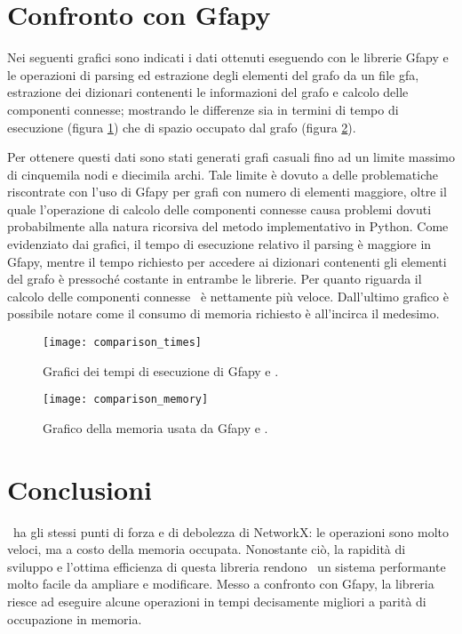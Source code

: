 \section{Confronto con Gfapy}
Nei seguenti grafici sono indicati i dati ottenuti eseguendo con le librerie
Gfapy e \pygfa le operazioni di parsing ed estrazione degli elementi del
grafo da un file gfa, estrazione dei dizionari contenenti le informazioni
del grafo e calcolo delle componenti connesse; mostrando
le differenze sia in termini di tempo di esecuzione (figura \ref{fig:comparison-times})
che di spazio occupato dal grafo (figura \ref{fig:comparison-memory}).

Per ottenere questi dati sono stati generati grafi casuali fino ad un limite massimo di cinquemila nodi
e diecimila archi. Tale limite è dovuto a delle problematiche riscontrate con l'uso di Gfapy
per grafi con numero di elementi maggiore, oltre il quale
l'operazione di calcolo delle componenti connesse causa problemi dovuti
probabilmente alla natura ricorsiva del metodo implementativo in Python.
Come evidenziato dai grafici, il tempo di esecuzione relativo il parsing
è maggiore in Gfapy, mentre il tempo richiesto per accedere ai dizionari
contenenti gli elementi del grafo è pressoché costante in entrambe le librerie.
Per quanto riguarda il calcolo delle componenti connesse \pygfa \ è nettamente
più veloce. Dall'ultimo grafico è possibile notare come il
consumo di memoria richiesto è all'incirca il medesimo.

\captionsetup{justification=centering, singlelinecheck=false}
\begin{figure}[h]
\centering
\texttt{[image: comparison\_times]}
\caption[Grafici dei tempi di esecuzione di Gfapy e \pygfa]{Grafici dei tempi di esecuzione di Gfapy e \pygfa.}
\label{fig:comparison-times}
\end{figure}
\captionsetup{justification=justified, singlelinecheck=false}


\captionsetup{justification=centering, singlelinecheck=false}
\begin{figure}[h]
\centering
\texttt{[image: comparison\_memory]}
\caption[Grafico della memoria usata da Gfapy e \pygfa]{Grafico della memoria usata da Gfapy e \pygfa.}
\label{fig:comparison-memory}
\end{figure}
\captionsetup{justification=justified, singlelinecheck=false}


\clearpage
\section{Conclusioni}
\pygfa \  ha gli stessi punti di forza e di debolezza di NetworkX:
le operazioni sono molto veloci, ma a costo della memoria occupata.
Nonostante ciò, la rapidità di sviluppo e l'ottima efficienza di questa libreria
rendono \pygfa \  un sistema performante molto facile da ampliare e modificare.
Messo a confronto con Gfapy, la libreria riesce ad eseguire alcune operazioni
in tempi decisamente migliori a parità di occupazione in memoria.
